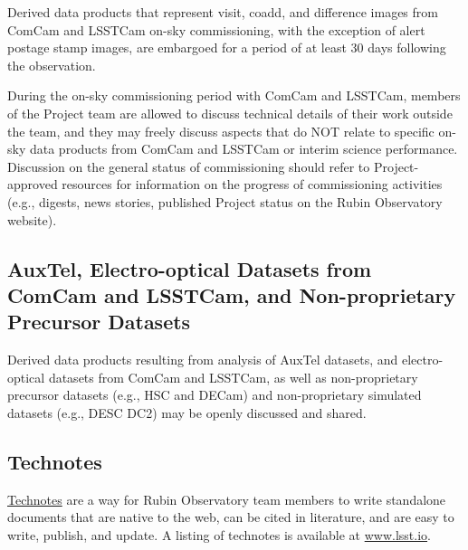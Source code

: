 \documentclass[SE,authoryear,toc,lsstdraft]{lsstdoc}
\begin{document}
Derived data products that represent visit, coadd, and difference images from ComCam and LSSTCam on-sky commissioning, with the exception of alert postage stamp images, are embargoed for a period of at least 30 days following the observation.


During the on-sky commissioning period with ComCam and LSSTCam, members of the Project team are allowed to discuss technical details of their work outside the team, and they may freely discuss aspects that do NOT relate to specific on-sky data products from ComCam and LSSTCam or interim science performance.
Discussion on the general status of commissioning should refer to Project-approved resources for information on the progress of commissioning activities (e.g., digests, news stories, published Project status on the Rubin Observatory website).

\subsection{AuxTel, Electro-optical Datasets from ComCam and LSSTCam, and Non-proprietary Precursor Datasets}

Derived data products resulting from analysis of AuxTel datasets, and electro-optical datasets from ComCam and LSSTCam, as well as non-proprietary precursor datasets (e.g., HSC and DECam) and non-proprietary simulated datasets (e.g., DESC DC2) may be openly discussed and shared.



\subsection{Technotes}
\label{technotes}

\href{https://developer.lsst.io/project-docs/technotes.html}{Technotes} are a way for Rubin Observatory team members to write standalone documents that are native to the web, can be cited in literature, and are easy to write, publish, and update.
A listing of technotes is available at \url{www.lsst.io}.
\end{document}
